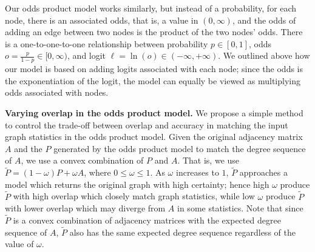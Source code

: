Our odds product model works similarly, but instead of a probability, for each node, there is an associated odds, that is, a value in $(0,\infty)$, and the odds of adding an edge between two nodes is the product of the two nodes' odds. There is a one-to-one-to-one relationship between probability $p \in [0,1]$, odds $o=\tfrac{p}{1-p} \in [0,\infty)$, and logit $\ell = \ln(o)\in (-\infty,+\infty)$. We outlined above how our model is based on adding logits associated with each node; since the odds is the exponentiation of the logit, the model can equally be viewed as multiplying odds associated with nodes. %


\noindent\textbf{Varying overlap in the odds product model.} We propose a simple method to control the trade-off between overlap and accuracy in matching the input graph statistics in the odds product model. %
Given the original adjacency matrix $A$ and the $P$ generated by the odds product model to match the degree sequence of $A$, we use a convex combination of $P$ and $A$. That is, we use $\tilde{P} = (1-\omega) P + \omega A$, where $0 \leq \omega \leq 1$. As $\omega$ increases to $1$, $\tilde{P}$ approaches a model which returns the original graph with high certainty; hence high $\omega$ produce $\tilde{P}$ with high overlap which closely match graph statistics, while low $\omega$ produce $\tilde{P}$ with lower overlap which may diverge from $A$ in some statistics.
Note that since $\tilde{P}$ is a convex combination of adjacency matrices with the expected degree sequence of $A$, $\tilde{P}$ also has the same expected degree sequence regardless of the value of $\omega$.


